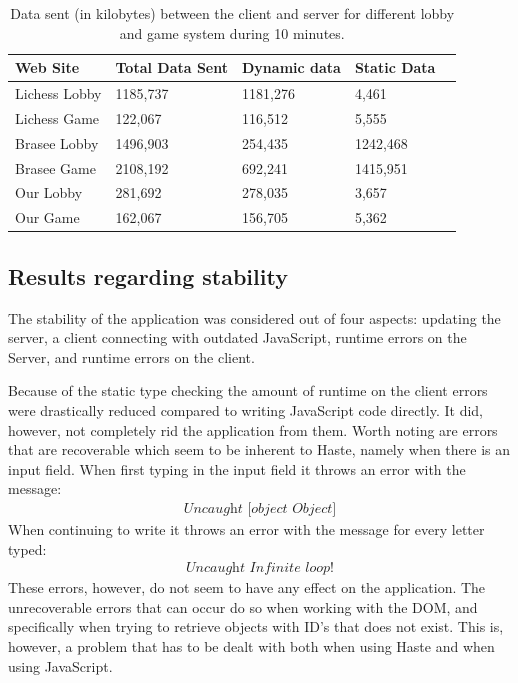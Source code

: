 \documentclass[a4paper]{article}
\begin{document}
\begin{table}[H]
\centering
\begin{tabular}{|l|l|l|l|l}
\hline
\textbf{Web Site} & \textbf{Total Data Sent} & \textbf{Dynamic data}     & \textbf{Static Data}       &  \\ \hline
Lichess Lobby  & 1185,737         & 1181,276    & 4,461           &  \\ \hline
Lichess Game   & 122,067          & 116,512     & 5,555           &  \\ \hline
Brasee Lobby   & 1496,903         & 254,435     & 1242,468        &  \\ \hline
Brasee Game    & 2108,192         & 692,241     & 1415,951        &  \\ \hline
Our Lobby      & 281,692          & 278,035     & 3,657           &  \\ \hline
Our Game       & 162,067          & 156,705     & 5,362           &  \\ \hline
\end{tabular}
\caption{Data sent (in kilobytes) between the client and server for different lobby and game system during 10 minutes.}
\label{tab:site-comparisons}
\end{table}

\subsection{Results regarding stability}
\label{sub:stability-results}
The stability of the application was considered out of four aspects: updating the server, a client connecting with outdated JavaScript, runtime errors on the Server, and runtime errors on the client.

Because of the static type checking the amount of runtime on the client errors were drastically reduced compared to writing JavaScript code directly. It did, however, not completely rid the application from them. Worth noting are errors that are recoverable which seem to be inherent to Haste, namely when there is an input field. When first typing in the input field it throws an error with the message:
\begin{align*}
    \textit{Uncaught [object Object]}
\end{align*} 
When continuing to write it throws an error with the message for every letter typed:
\begin{align*}
    \textit{Uncaught Infinite loop!}
\end{align*}
These errors, however, do not seem to have any effect on the application. The unrecoverable errors that can occur do so when working with the DOM, and specifically when trying to retrieve objects with ID's that does not exist. This is, however, a problem that has to be dealt with both when using Haste and when using JavaScript.
\end{document}
